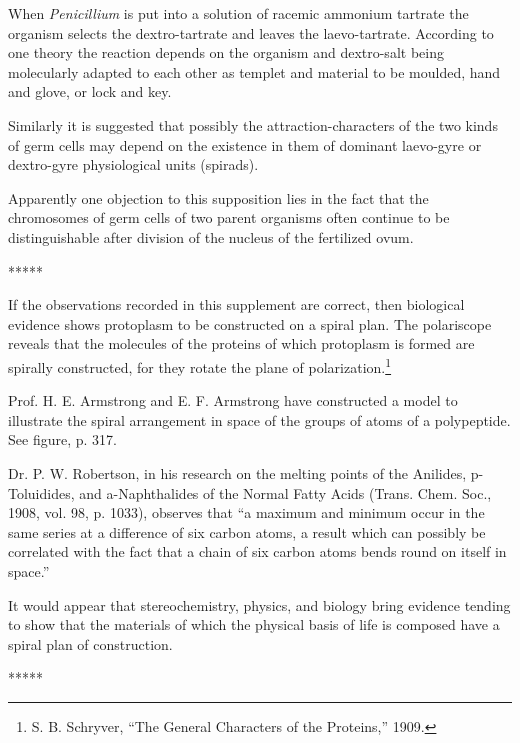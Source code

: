 \documentclass[a4paper, 12pt, oneside, landscape]{article}
\begin{document}
When \emph{Penicillium} is put into a solution of racemic ammonium tartrate the organism selects the dextro-tartrate and leaves the laevo-tartrate. According to one theory the reaction depends on the organism and dextro-salt being molecularly adapted to each other as templet and material to be moulded, hand and glove, or lock and key.

Similarly it is suggested that possibly the attraction-characters of the two kinds of germ cells may depend on the existence in them of dominant laevo-gyre or dextro-gyre physiological units (spirads).

Apparently one objection to this supposition lies in the fact that the chromosomes of germ cells of two parent organisms often continue to be distinguishable after division of the nucleus of the fertilized ovum.

\centerline{*\hspace{15mm}*\hspace{15mm}*\hspace{15mm}*\hspace{15mm}*}
\bigskip

If the observations recorded in this supplement are correct, then biological evidence shows protoplasm to be constructed on a spiral plan. The polariscope reveals that the molecules of the proteins of which protoplasm is formed are spirally constructed, for they rotate the plane of polarization.\footnote{S. B. Schryver, ``The General Characters of the Proteins,'' 1909.}

Prof. H. E. Armstrong and E. F. Armstrong have constructed a model to illustrate the spiral arrangement in space of the groups of atoms of a polypeptide. See figure, p. 317.

Dr. P. W. Robertson, in his research on the melting points of the Anilides, p-Toluidides, and a-Naphthalides of the Normal Fatty Acids (Trans. Chem. Soc., 1908, vol. 98, p. 1033), observes that ``a maximum and minimum occur in the same series at a difference of six carbon atoms, a result which can possibly be correlated with the fact that a chain of six carbon atoms bends round on itself in space.''

It would appear that stereochemistry, physics, and biology bring evidence tending to show that the materials of which the physical basis of life is composed have a spiral plan of construction.

\centerline{*\hspace{15mm}*\hspace{15mm}*\hspace{15mm}*\hspace{15mm}*}
\bigskip
\end{document}
